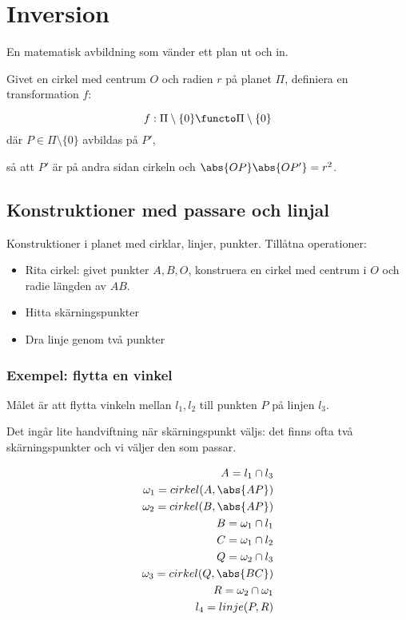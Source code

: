 
\section{Inversion}
En matematisk avbildning som vänder ett plan ut och in.

Givet en cirkel med centrum $O$ och radien $r$ på planet $\Pi$, definiera en transformation $f$:

\[ f: \Pi \setminus \{ 0 \} \functo \Pi \setminus \{ 0 \} \]
där $P \in \Pi \setminus \{ 0 \}$ avbildas på $P'$,

så att $P'$ är på andra sidan cirkeln och $\abs{OP} \abs{OP'} = r^2$.

\subsection{Konstruktioner med passare och linjal}
Konstruktioner i planet med cirklar, linjer, punkter. Tillåtna operationer:

\begin{itemize}
\item Rita cirkel: givet punkter $A,B,O$, konstruera en cirkel med centrum i $O$ och radie längden av $AB$.
\item Hitta skärningspunkter
\item Dra linje genom två punkter
\end{itemize}

\subsubsection{Exempel: flytta en vinkel}
Målet är att flytta vinkeln mellan $l_1,l_2$ till punkten $P$ på linjen $l_3$.


Det ingår lite handviftning när skärningspunkt väljs: det finns ofta två skärningspunkter och vi väljer den som passar.

\begin{eqnarray*}
A = l_1 \cap l_3 \\
\omega_1 = cirkel(A, \abs{AP}) \\
\omega_2 = cirkel(B, \abs{AP}) \\
B = \omega_1 \cap l_1 \\
C = \omega_1 \cap l_2 \\
Q = \omega_2 \cap l_3 \\
\omega_3 = cirkel(Q, \abs{BC}) \\
R = \omega_2 \cap \omega_1 \\
l_4 = linje(P,R)
\end{eqnarray*}

